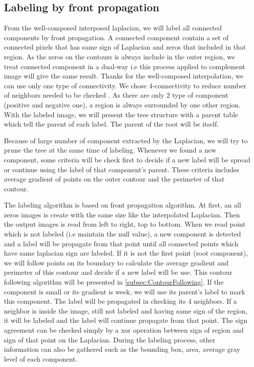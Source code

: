 \subsection{Labeling by front propagation} \label{labeling}
\par From the well-composed interposed laplacian, we will label all connected components by front propagation. A connected component contain a set of connected pixels that has same sign of Laplacian and zeros that included in that region. As the zeros on the contours is always include in the outer region, we treat connected component in a dual-way i.e this process applied to complement image will give the same result. Thanks for the well-composed interpolation, we can use only one type of connectivity. We chose 4-connectivity to reduce number of neighbors needed to be checked . As there are only 2 type of component (positive and negative one), a region is always surrounded by one other region. With the labeled image, we will present the tree structure with a parent table which tell the parent of each label. The parent of the root will be itself.
\par
Because of large number of component extracted by the Laplacian, we will try to prune the tree at the same time of labeling. Whenever we found a new component, some criteria will be check first to decide if a new label will be spread or continue using the label of that component's parent. These criteria includes average gradient of points on the outer contour and the perimeter of that contour.  
\par
The labeling algorithm is based on front propagation algorithm. At first, an all zeros images is create with the same size like the interpolated Laplacian. Then the output images is read from left to right, top to bottom. When we read point which is not labeled (i.e maintain the null value), a new component is detected and a label will be propagate from that point until all connected points which have same laplacian sign are labeled. If it is not the first point (root component), we will follow points on its boundary to calculate the average gradient and perimeter of this contour and decide if a new label will be use. This contour following algorithm will be presented in \ref{subsec:ContourFollowing}. If the component is small or its gradient is week, we will use its parent's label to mark this component. The label will be propagated in checking its 4 neighbors. If a neighbor is inside the image, still not labeled and having same sign of the region, it will be labeled and the label will continue propagate from that point. The sign agreement can be checked simply by a xor operation between sign of region and sign of that point on the Laplacian. During the labeling process, other information can also be gathered such as the bounding box, area, average gray level of each component. 
